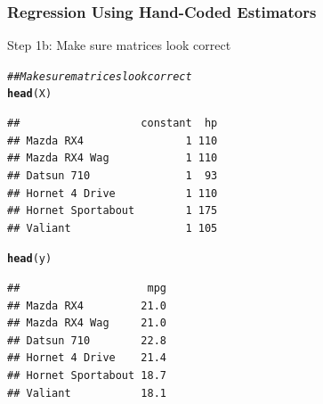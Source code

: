 \documentclass{beamer}\usepackage[]{graphicx}\usepackage[]{color}
\makeatletter
\newcommand{\hlcom}[1]{\textcolor[rgb]{0.678,0.584,0.686}{\textit{#1}}}%
\newcommand{\hlopt}[1]{\textcolor[rgb]{0,0,0}{#1}}%
\newcommand{\hlstd}[1]{\textcolor[rgb]{0.345,0.345,0.345}{#1}}%
\newcommand{\hlkwb}[1]{\textcolor[rgb]{0.69,0.353,0.396}{#1}}%
\newcommand{\hlkwd}[1]{\textcolor[rgb]{0.737,0.353,0.396}{\textbf{#1}}}%
\newenvironment{kframe}{%
 \def\at@end@of@kframe{}%
 \ifinner\ifhmode%
  \def\at@end@of@kframe{\end{minipage}}%
  \begin{minipage}{\columnwidth}%
 \fi\fi%
 \def\FrameCommand##1{\hskip\@totalleftmargin \hskip-\fboxsep
 \colorbox{shadecolor}{##1}\hskip-\fboxsep
     \hskip-\linewidth \hskip-\@totalleftmargin \hskip\columnwidth}%
 \MakeFramed {\advance\hsize-\width
   \@totalleftmargin\z@ \linewidth\hsize
   \@setminipage}}%
 {\par\unskip\endMakeFramed%
 \at@end@of@kframe}
\newenvironment{knitrout}{}{} %
\makeatother
\begin{document}
\begin{frame}[fragile]\frametitle{Regression Using Hand-Coded Estimators}
    Step 1b: Make sure matrices look correct
\begin{knitrout}\footnotesize
{}\color{fgcolor}\begin{kframe}
\begin{alltt}
\hlcom{## Make sure matrices look correct}
\hlkwd{head}\hlstd{(X)}
\end{alltt}
\begin{verbatim}
##                   constant  hp
## Mazda RX4                1 110
## Mazda RX4 Wag            1 110
## Datsun 710               1  93
## Hornet 4 Drive           1 110
## Hornet Sportabout        1 175
## Valiant                  1 105
\end{verbatim}
\begin{alltt}
\hlkwd{head}\hlstd{(y)}
\end{alltt}
\begin{verbatim}
##                    mpg
## Mazda RX4         21.0
## Mazda RX4 Wag     21.0
## Datsun 710        22.8
## Hornet 4 Drive    21.4
## Hornet Sportabout 18.7
## Valiant           18.1
\end{verbatim}
\end{kframe}
\end{knitrout}
\end{frame}

\end{document}
